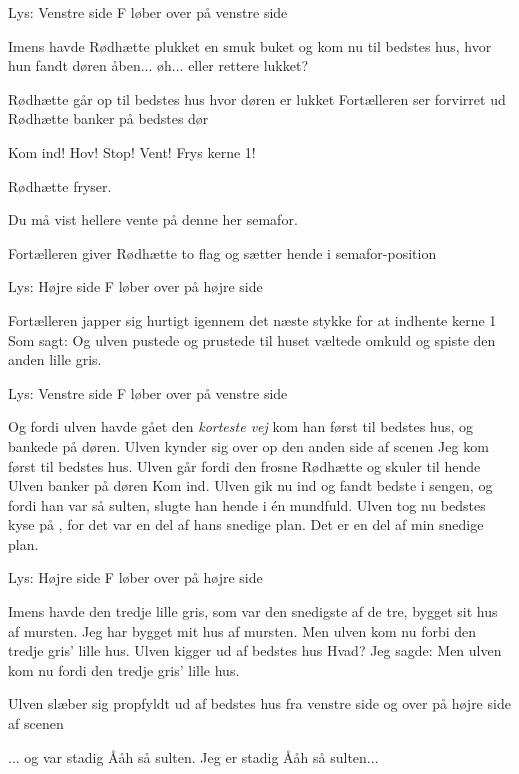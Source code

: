 \documentclass[a4paper,11pt]{article}
\begin{document}
\begin{sketch}
\scene Lys: Venstre side
\scene F løber over på venstre side

 Imens havde Rødhætte plukket en smuk buket og kom nu til bedstes hus, hvor hun fandt døren åben... øh... eller rettere lukket?

\scene Rødhætte går op til bedstes hus hvor døren er lukket
\scene Fortælleren ser forvirret ud
\scene Rødhætte banker på bedstes dør

 Kom ind!
 Hov! Stop! Vent! Frys kerne 1!

\scene Rødhætte fryser.

 Du må vist hellere vente på denne her semafor.

\scene Fortælleren giver Rødhætte to flag og sætter hende i semafor-position

\scene Lys: Højre side
\scene F løber over på højre side

\scene Fortælleren japper sig hurtigt igennem det næste stykke for at indhente kerne 1
 Som sagt: Og ulven pustede og prustede til huset væltede omkuld og spiste den anden lille gris.

\scene Lys: Venstre side
\scene F løber over på venstre side

 Og fordi ulven havde gået den \emph{korteste vej} kom han først til bedstes hus, og bankede på døren.
\scene Ulven kynder sig over op den anden side af scenen
 Jeg kom først til bedstes hus.
\scene Ulven går fordi den frosne Rødhætte og skuler til hende
\scene Ulven banker på døren
 Kom ind.
 Ulven gik nu ind og fandt bedste i sengen, og fordi han var så sulten, slugte han hende i én mundfuld.
 Ulven tog nu bedstes kyse på , for det var en del af hans snedige plan.
 Det er en del af min snedige plan.

\scene Lys: Højre side
\scene F løber over på højre side

 Imens havde den tredje lille gris, som var den snedigste af de tre, bygget sit hus af mursten.
 Jeg har bygget mit hus af mursten.
 Men ulven kom nu forbi den tredje gris' lille hus.
\scene Ulven kigger ud af bedstes hus
 Hvad?
 Jeg sagde: Men ulven kom nu fordi den tredje gris' lille hus.

\scene Ulven slæber sig propfyldt ud af bedstes hus fra venstre side og over på højre side af scenen

 ... og var stadig Ååh så sulten.
 Jeg er stadig Ååh så sulten...


\end{sketch}
\end{document}
